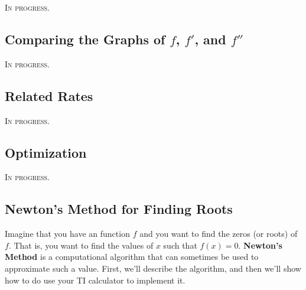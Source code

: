 \documentclass{article}
\theoremstyle{definition}
\theoremstyle{definition}
\begin{document}
\textsc{In progress.}



\subsection{Comparing the Graphs of $f$, $f'$, and $f''$}
\textsc{In progress.}






\subsection{Related Rates}
\textsc{In progress.}


\subsection{Optimization}
\textsc{In progress.}


\subsection{Newton's Method for Finding Roots}

Imagine that you have an function $f$ and you want to find the zeros (or roots) of $f$. That is, you want to find the values of $x$ such that $f(x)=0$. \textbf{Newton's Method} is a computational algorithm that can sometimes be used to approximate such a value. First, we'll describe the algorithm, and then we'll show how to do use your TI calculator to implement it.
\end{document}
